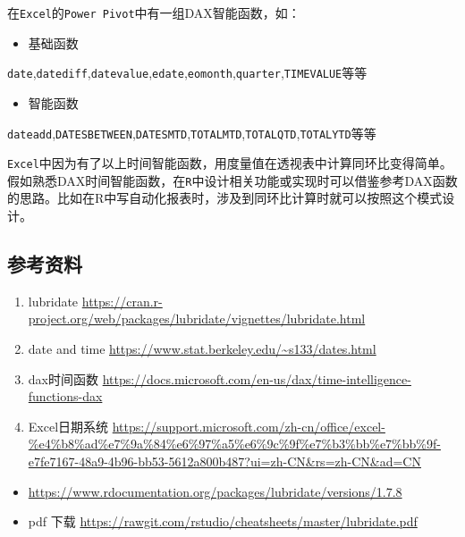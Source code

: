 \documentclass[
]{book}
\providecommand{\tightlist}{%
  \setlength{\itemsep}{0pt}\setlength{\parskip}{0pt}}
\begin{document}
在\texttt{Excel}的\texttt{Power\ Pivot}中有一组DAX智能函数，如：

\begin{itemize}
\tightlist
\item
  基础函数
\end{itemize}

\texttt{date},\texttt{datediff},\texttt{datevalue},\texttt{edate},\texttt{eomonth},\texttt{quarter},\texttt{TIMEVALUE}等等

\begin{itemize}
\tightlist
\item
  智能函数
\end{itemize}

\texttt{dateadd},\texttt{DATESBETWEEN},\texttt{DATESMTD},\texttt{TOTALMTD},\texttt{TOTALQTD},\texttt{TOTALYTD}等等

\texttt{Excel}中因为有了以上时间智能函数，用度量值在透视表中计算同环比变得简单。
假如熟悉DAX时间智能函数，在\texttt{R}中设计相关功能或实现时可以借鉴参考DAX函数的思路。比如在R中写自动化报表时，涉及到同环比计算时就可以按照这个模式设计。

\hypertarget{ux53c2ux8003ux8d44ux6599-1}{%
\subsection{参考资料}\label{ux53c2ux8003ux8d44ux6599-1}}

\begin{enumerate}
\def\labelenumi{\arabic{enumi}.}
\item
  lubridate \url{https://cran.r-project.org/web/packages/lubridate/vignettes/lubridate.html}
\item
  date and time \url{https://www.stat.berkeley.edu/~s133/dates.html}
\item
  dax时间函数 \url{https://docs.microsoft.com/en-us/dax/time-intelligence-functions-dax}
\item
  Excel日期系统 \url{https://support.microsoft.com/zh-cn/office/excel-\%e4\%b8\%ad\%e7\%9a\%84\%e6\%97\%a5\%e6\%9c\%9f\%e7\%b3\%bb\%e7\%bb\%9f-e7fe7167-48a9-4b96-bb53-5612a800b487?ui=zh-CN\&rs=zh-CN\&ad=CN}
\end{enumerate}

\begin{itemize}
\item
  \url{https://www.rdocumentation.org/packages/lubridate/versions/1.7.8}
\item
  pdf 下载 \url{https://rawgit.com/rstudio/cheatsheets/master/lubridate.pdf}
\end{itemize}
\end{document}
